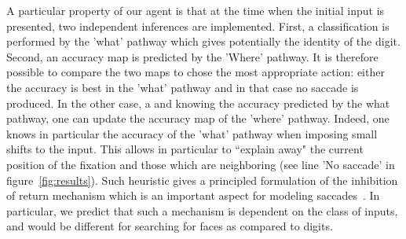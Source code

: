 A particular property of our agent is that at the time when the initial input is presented, two independent inferences are implemented. First, a classification is performed by the 'what' pathway which gives potentially the identity of the digit. Second, an accuracy map is predicted by the 'Where' pathway. It is therefore possible to compare the two maps to chose the most appropriate action: either the  accuracy is best in the 'what' pathway and in that case no saccade is produced. In the other case, a and knowing the accuracy predicted by the what pathway, one can update the accuracy map of the 'where' pathway. Indeed, one knows in particular the accuracy of the 'what' pathway when imposing small shifts to the input. This allows in particular to ``explain away" the current position of the fixation and those which are neighboring (see line 'No saccade' in figure~\ref{fig:results}). Such heuristic gives a principled formulation of the inhibition of return mechanism which is an important aspect for modeling saccades~\citep{Itti01}. In particular, we predict that such a mechanism is dependent on the class of inputs, and would be different for searching for faces as compared to digits.
